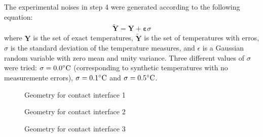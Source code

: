 \documentclass[12pt]{CHT-20}
\begin{document}
The experimental noises in step 4 were generated according to the following equation:
\begin{align}
\tilde{\mathbf{Y}} = \mathbf{Y} + \mathbf{\varepsilon} \sigma \label{modelagem_erro}
\end{align}
where $\mathbf{Y}$ is the set of exact temperatures, $\tilde{\mathbf{Y}}$ is the set of temperatures with erros, $\sigma$ is the standard deviation of the temperature measures, and $\epsilon$ is a Gaussian random variable with zero mean and unity variance. Three different values of $\sigma$ were tried: $\sigma = \text{0.0}\celsius$ (corresponding to synthetic temperatures with no measuremente errors), $\sigma = \text{0.1}\celsius$ and $\sigma = \text{0.5}\celsius$.

\begin{figure}[H]
	\begin{center}
		\caption{Geometry for contact interface 1}
		\label{fig3a}
	\end{center}
\end{figure}

\begin{figure}[H]
	\begin{center}
		\caption{Geometry for contact interface 2}
		\label{fig3b}
	\end{center}
\end{figure}

\begin{figure}[H]
	\begin{center}
		\caption{Geometry for contact interface 3}
		\label{fig3c}
	\end{center}
\end{figure}
\end{document}
